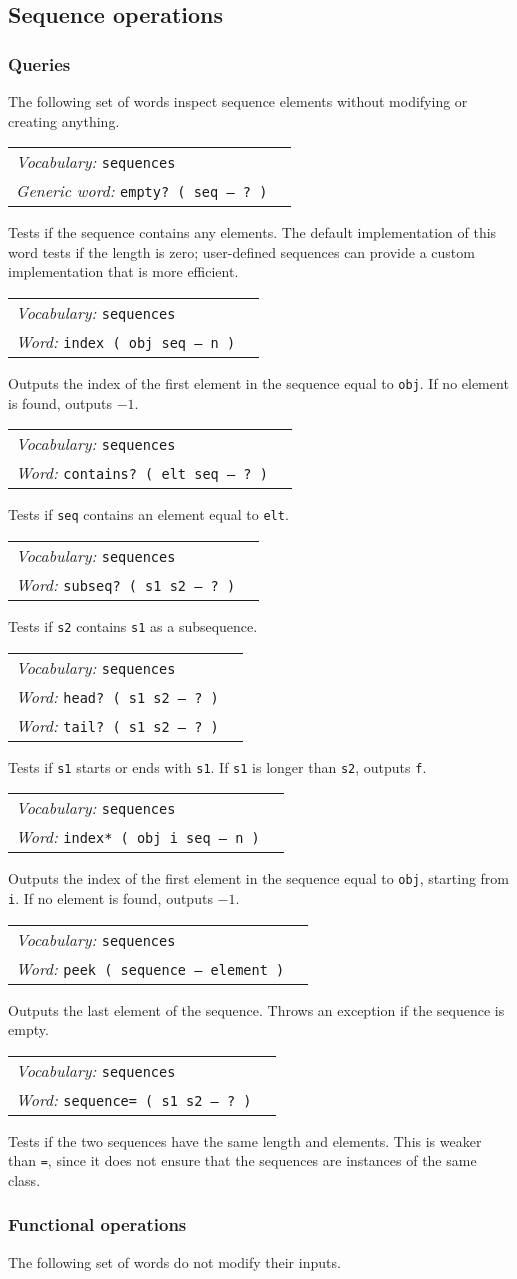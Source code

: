 \documentclass{book}
\newcommand{\vocabulary}[1]{\emph{Vocabulary:} \texttt{#1}&\\}
\newcommand{\ordinaryword}[2]{\index{\texttt{#1}}\emph{Word:} \texttt{#2}&\\}
\newcommand{\genericword}[2]{\index{\texttt{#1}}\emph{Generic word:} \texttt{#2}&\\}
\newcommand{\wordtable}[1]{


\begin{tabularx}{12cm}{lX}
\hline
#1
\hline
\end{tabularx}

}
\begin{document}
\subsection{Sequence operations}

\subsubsection{Queries}

The following set of words inspect sequence elements without modifying or creating anything.

\wordtable{
\vocabulary{sequences}
\genericword{empty?}{empty?~( seq -- ?~)}
}
Tests if the sequence contains any elements. The default implementation of this word tests if the length is zero; user-defined sequences can provide a custom implementation that is more efficient.
\wordtable{
\vocabulary{sequences}
\ordinaryword{index}{index ( obj seq -- n )}
}
Outputs the index of the first element in the sequence equal to \texttt{obj}. If no element is found, outputs $-1$.
\wordtable{
\vocabulary{sequences}
\ordinaryword{contains?}{contains?~( elt seq -- ?~)}
}
Tests if \texttt{seq} contains an element equal to \texttt{elt}.
\wordtable{
\vocabulary{sequences}
\ordinaryword{subseq?}{subseq?~( s1 s2 -- ?~)}
}
Tests if \texttt{s2} contains \texttt{s1} as a subsequence.
\wordtable{
\vocabulary{sequences}
\ordinaryword{head?}{head?~( s1 s2 -- ?~)}
\ordinaryword{tail?}{tail?~( s1 s2 -- ?~)}

}
Tests if \texttt{s1} starts or ends with \texttt{s1}. If \texttt{s1} is longer than \texttt{s2}, outputs \texttt{f}.
\wordtable{
\vocabulary{sequences}
\ordinaryword{index*}{index* ( obj i seq -- n )}
}
Outputs the index of the first element in the sequence equal to \texttt{obj}, starting from \texttt{i}. If no element is found, outputs $-1$.
\wordtable{
\vocabulary{sequences}
\ordinaryword{peek}{peek ( sequence -- element )}
}
Outputs the last element of the sequence. Throws an exception if the sequence is empty.
\wordtable{
\vocabulary{sequences}
\ordinaryword{sequence=}{sequence= ( s1 s2 -- ?~)}
}
Tests if the two sequences have the same length and elements. This is weaker than \texttt{=}, since it does not ensure that the sequences are instances of the same class.

\subsubsection{Functional operations}

The following set of words do not modify their inputs.
\end{document}
